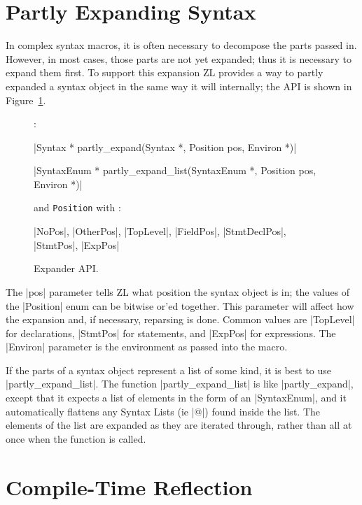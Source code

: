 \section{Partly Expanding Syntax}

In complex syntax macros, it is often necessary to decompose the parts
passed in.  However, in most cases, those parts are not yet expanded;
thus it is necessary to expand them first.  To support this expansion
ZL provides a way to partly expanded a syntax object in the same way
it will internally; the API is shown in Figure~\ref{expander}.

\begin{figure}
\begin{apil}
\item {}:
\begin{apill}
\item |Syntax * partly_expand(Syntax *, Position pos, Environ *)|
\item |SyntaxEnum * partly_expand_list(SyntaxEnum *, Position pos, Environ *)|
\end{apill}
and  \verb/Position/ with :
\begin{apill}
\item |NoPos|, |OtherPos|, |TopLevel|, |FieldPos|, |StmtDeclPos|, |StmtPos|, |ExpPos|
\end{apill}
\end{apil}
\caption{Expander API.}
\label{expander}
\end{figure}

The |pos| parameter tells ZL what position the syntax object is
in; the values of the |Position| enum can be bitwise or'ed together.
This parameter will affect how the expansion and, if
necessary, reparsing is done.  Common
values are |TopLevel| for declarations, |StmtPos| for statements, and
|ExpPos| for expressions. The |Environ| parameter is the
environment as passed into the macro.  

If the parts of a syntax object represent a list of some kind, it is
best to use |partly_expand_list|.  The function |partly_expand_list|
is like |partly_expand|, except that it expects a list of elements in
the form of an |SyntaxEnum|, and it automatically flattens any Syntax
Lists (ie |@|) found inside the list.  The elements of the list are
expanded as they are iterated through, rather than all at once when
the function is called.

\section{Compile-Time Reflection}

